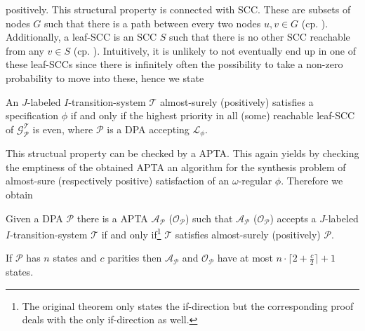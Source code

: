 positively. This structural property is connected with \ac{SCC}. These are 
subsets of nodes $G$ such that there is a path between every two nodes 
$u,v\in G$ (cp. \cite{Tarjan}). Additionally, a leaf-\ac{SCC} is an \ac{SCC} 
$S$ such that there is no other \ac{SCC} reachable from any $v\in S$ (cp. 
\cite[Bottom-\ac{SCC}]{ComplexProbVerification}). Intuitively, it is unlikely 
to not eventually end up in one of these leaf-\acp{SCC} since there is 
infinitely often the possibility to take a non-zero probability to move into 
these, hence we state
\begin{lemma}
  \cite[Lemma 1]{SynProbEnv}
  An $J$-labeled $I$-transition-system $\mathcal{T}$ almost-surely (positively)
  satisfies a specification $\phi$ if and only if the highest priority in all
  (some) reachable leaf-\ac{SCC} of $\mathcal{G}_{\mathcal{P}}^{\mathcal{T}}$
  is even, where $\mathcal{P}$ is a \ac{DPA} accepting $\mathcal{L}_{\phi}$.
\end{lemma}
This structual property can be checked by a \ac{APTA}. This again yields by
checking the emptiness of the obtained \ac{APTA} an algorithm for the synthesis
problem of almost-sure (respectively positive) satisfaction of an 
$\omega$-regular $\phi$. Therefore we obtain
\begin{theorem}
  \cite[Theorem 1]{SynProbEnv}
  Given a \ac{DPA} $\mathcal{P}$ there is a \ac{APTA} 
  $\mathcal{A}_{\mathcal{P}}$ ($\mathcal{O}_{\mathcal{P}}$) such that 
  $\mathcal{A}_{\mathcal{P}}$ ($\mathcal{O}_{\mathcal{P}}$) accepts a 
  $J$-labeled $I$-transition-system $\mathcal{T}$ if and only 
  if\footnote{The original theorem only states the if-direction but the 
  corresponding proof deals with the only if-direction as well.} $\mathcal{T}$ 
  satisfies almost-surely (positively) $\mathcal{P}$.

  If $\mathcal{P}$ has $n$ states and $c$ parities then 
  $\mathcal{A}_{\mathcal{P}}$ and $\mathcal{O}_{\mathcal{P}}$ have at most
  $n\cdot\lceil 2 + \frac{c}{2}\rceil + 1$ states.
  \label{thm:probenvsynthesis}
\end{theorem}

